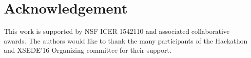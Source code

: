 \documentclass[conference]{IEEEtran}
\begin{document}
\section*{Acknowledgement}
This work is supported by NSF ICER 1542110 and associated collaborative
awards. The authors would like to thank the many participants of the Hackathon
and XSEDE'16 Organizing committee for their support.






%
%
%
%



\end{document}
